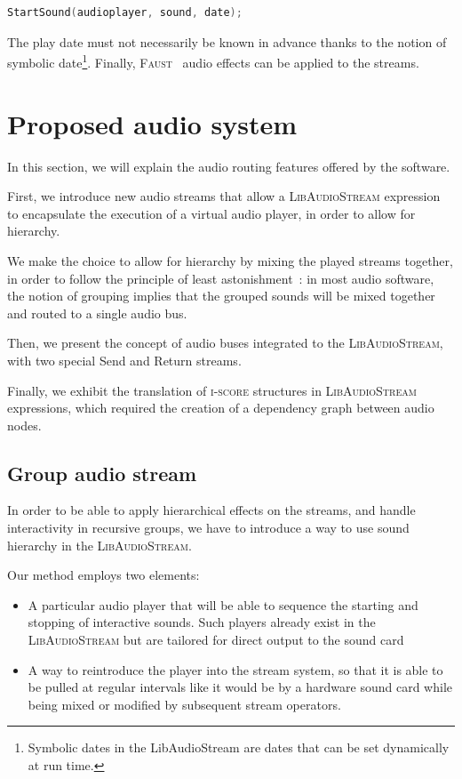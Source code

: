\documentclass{article}
\newcommand*{\LibAudioStream}{\textsc{LibAudioStream}\xspace}
\newcommand*{\iscore}{\textsc{i-score}\xspace}
\newcommand*{\faust}{\textsc{Faust}\xspace}
\begin{document}
\begin{lstlisting}[language=C++,columns=fullflexible,basicstyle=\ttfamily]
StartSound(audioplayer, sound, date);
\end{lstlisting}

The play date must not necessarily be known in advance thanks to the notion of symbolic date\footnote{Symbolic dates in the LibAudioStream are dates that can be set dynamically at run time.}.
Finally, \faust~\cite{orlarey2009faust} audio effects can be applied to the streams.

\section{Proposed audio system}
In this section, we will explain the audio routing 
features offered by the software.

First, we introduce new audio streams that allow a \LibAudioStream
expression to encapsulate the execution of a virtual audio player, 
in order to allow for hierarchy.

We make the choice to allow for hierarchy by mixing the played streams together, in order to follow the principle of least astonishment~\cite{seebach2001cranky}: in most audio software, the notion of grouping implies that the grouped sounds will be mixed 
together and routed to a single audio bus.

Then, we present the concept of audio buses integrated to the \LibAudioStream,
with two special Send and Return streams.

Finally, we exhibit the translation of \iscore structures in \LibAudioStream expressions, 
which required the creation of a dependency graph between audio nodes.

\subsection{Group audio stream}
In order to be able to apply hierarchical effects on the streams, 
and handle interactivity in recursive groups, we have to introduce a way to use sound hierarchy in the \LibAudioStream.

Our method employs two elements: 
\begin{itemize}
	\item A particular audio player that will be able to sequence the starting and stopping 
	of interactive sounds.
	Such players already exist in the \LibAudioStream but are tailored for direct output to
	the sound card
	\item A way to reintroduce the player into the stream system, so that it 
	is able to be pulled at regular intervals like it would be by a hardware sound card while being mixed or modified by subsequent stream operators.
\end{itemize}
\end{document}
